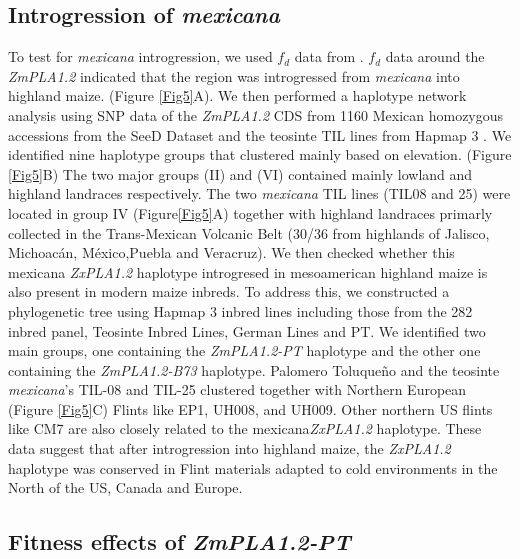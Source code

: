 \documentclass[9pt,twocolumn,twoside,lineno]{BioRxiv}
\begin{document}
\subsection{Introgression of \textit{mexicana}} 
To test for \textit{mexicana} introgression, we used \(f_d\) data from \cite{Gonzalez-Segovia2019-jy}.
\(f_d\) data around the \textit{ZmPLA1.2} indicated that the region was introgressed from \textit{mexicana} into highland maize. (Figure \ref{Fig5}A).
We then performed a haplotype network analysis using SNP data of the \textit{ZmPLA1.2} CDS from 1160 Mexican homozygous accessions from the SeeD Dataset \cite{Romero_Navarro2017-cn} and the teosinte TIL lines from Hapmap 3 \cite{Bukowski2017-ng}.   
We identified nine haplotype groups that clustered mainly based on elevation. (Figure \ref{Fig5}B) 
The two major groups (II) and (VI) contained mainly lowland and highland landraces respectively. 
The two \textit{mexicana} TIL lines (TIL08 and 25) were located in group IV  (Figure\ref{Fig5}A) together with highland landraces primarly collected in the Trans-Mexican Volcanic Belt (30/36 from highlands of Jalisco, Michoacán, México,Puebla and Veracruz).
We then checked whether this mexicana \textit{ZxPLA1.2} haplotype introgresed in mesoamerican highland maize is also present in modern maize inbreds. 
To address this, we constructed a phylogenetic tree using Hapmap 3 inbred lines including those from the 282 inbred panel, Teosinte Inbred Lines, German Lines and PT. 
We identified two main groups, one containing the \textit{ZmPLA1.2-PT} haplotype and the other one containing the \textit{ZmPLA1.2-B73} haplotype.
Palomero Toluqueño and the teosinte \textit{mexicana}'s TIL-08 and TIL-25 clustered together with Northern European (Figure \ref{Fig5}C) Flints like EP1, UH008, and UH009. 
Other northern US flints like CM7 are also closely related to the mexicana\textit{ZxPLA1.2} haplotype. 
These data suggest that after introgression into highland maize, the \textit{ZxPLA1.2} haplotype was conserved in Flint materials adapted to cold environments in the North of the US, Canada and Europe. 

\subsection{Fitness effects of \textit{ZmPLA1.2-PT}}
\end{document}
